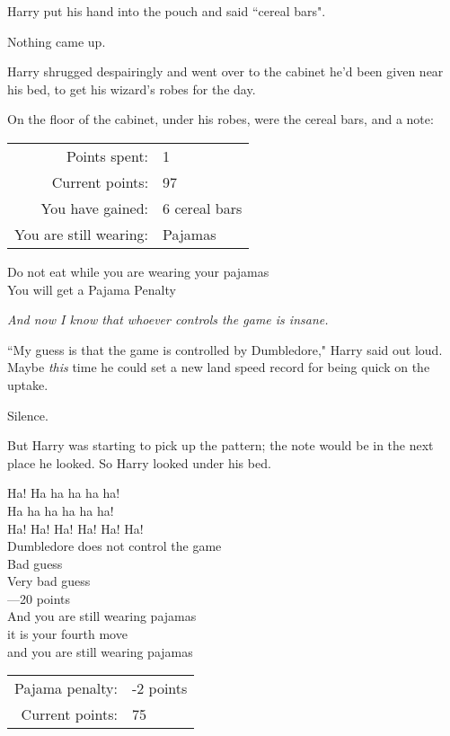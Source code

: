 Harry put his hand into the pouch and said ``cereal bars".

Nothing came up.

Harry shrugged despairingly and went over to the cabinet he'd been given near his bed, to get his wizard's robes for the day.

On the floor of the cabinet, under his robes, were the cereal bars, and a note:
\begin{writtenNote}
\begin{tabular}{rl}
Points spent: & 1\\
Current points: & 97\\
You have gained: & 6 cereal bars\\
You are still wearing: & Pajamas\\
\end{tabular}

Do not eat while you are wearing your pajamas\\
You will get a Pajama Penalty
\end{writtenNote}

\emph{And now I know that whoever controls the game is insane.}

``My guess is that the game is controlled by Dumbledore," Harry said out loud. Maybe \emph{this} time he could set a new land speed record for being quick on the uptake.

Silence.

But Harry was starting to pick up the pattern; the note would be in the next place he looked. So Harry looked under his bed.
\begin{writtenNote}
Ha! Ha ha ha ha ha!\\
Ha ha ha ha ha ha!\\
Ha! Ha! Ha! Ha! Ha! Ha!\\
Dumbledore does not control the game\\
Bad guess\\
Very bad guess\\
—20 points\\
And you are still wearing pajamas\\
it is your fourth move\\
and you are still wearing pajamas

\begin{tabular}{rl}
Pajama penalty: & -2 points\\
Current points: & 75
\end{tabular}
\end{writtenNote}

